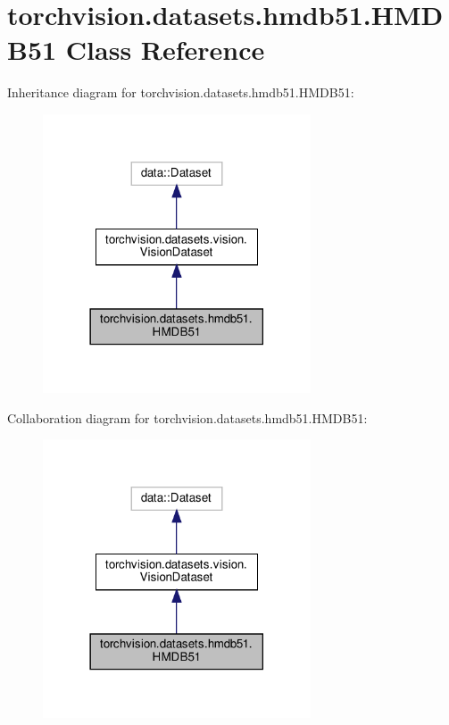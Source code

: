 \hypertarget{classtorchvision_1_1datasets_1_1hmdb51_1_1HMDB51}{}\section{torchvision.\+datasets.\+hmdb51.\+H\+M\+D\+B51 Class Reference}
\label{classtorchvision_1_1datasets_1_1hmdb51_1_1HMDB51}


Inheritance diagram for torchvision.\+datasets.\+hmdb51.\+H\+M\+D\+B51\+:
\nopagebreak
\begin{figure}[H]
\begin{center}
\leavevmode
\includegraphics[width=225pt]{classtorchvision_1_1datasets_1_1hmdb51_1_1HMDB51__inherit__graph}
\end{center}
\end{figure}


Collaboration diagram for torchvision.\+datasets.\+hmdb51.\+H\+M\+D\+B51\+:
\nopagebreak
\begin{figure}[H]
\begin{center}
\leavevmode
\includegraphics[width=225pt]{classtorchvision_1_1datasets_1_1hmdb51_1_1HMDB51__coll__graph}
\end{center}
\end{figure}
